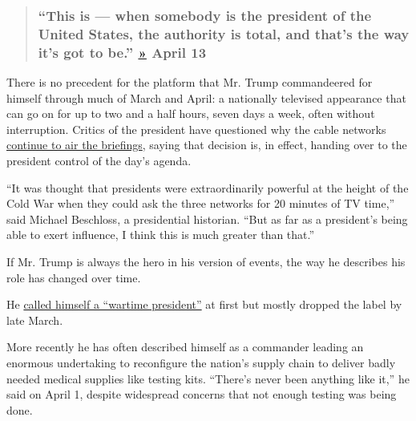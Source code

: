 \begin{quote}
\hypertarget{this-is--when-somebody-is-the-president-of-the-united-states-the-authority-is-total-and-thats-the-way-its-got-to-be--april-13}{%
\subsubsection{\texorpdfstring{``This is --- when somebody is the
president of the United States, the authority is total, and that's the
way it's got to be.''
\href{https://www.whitehouse.gov/briefings-statements/remarks-president-trump-vice-president-pence-members-coronavirus-task-force-press-briefing-25/}{»}
\textbf{April
13}}{``This is --- when somebody is the president of the United States, the authority is total, and that's the way it's got to be.'' » April 13}}\label{this-is--when-somebody-is-the-president-of-the-united-states-the-authority-is-total-and-thats-the-way-its-got-to-be--april-13}}
\end{quote}

There is no precedent for the platform that Mr. Trump commandeered for
himself through much of March and April: a nationally televised
appearance that can go on for up to two and a half hours, seven days a
week, often without interruption. Critics of the president have
questioned why the cable networks
\href{https://www.nytimes3xbfgragh.onion/2020/03/25/business/media/trump-coronavirus-briefings-ratings.html}{continue
to air the briefings}, saying that decision is, in effect, handing over
to the president control of the day's agenda.

``It was thought that presidents were extraordinarily powerful at the
height of the Cold War when they could ask the three networks for 20
minutes of TV time,'' said Michael Beschloss, a presidential historian.
``But as far as a president's being able to exert influence, I think
this is much greater than that.''

If Mr. Trump is always the hero in his version of events, the way he
describes his role has changed over time.

He
\href{https://www.nytimes3xbfgragh.onion/2020/03/22/us/politics/coronavirus-trump-wartime-president.html}{called
himself a ``wartime president''} at first but mostly dropped the label
by late March.

More recently he has often described himself as a commander leading an
enormous undertaking to reconfigure the nation's supply chain to deliver
badly needed medical supplies like testing kits. ``There's never been
anything like it,'' he said on April 1, despite widespread concerns that
not enough testing was being done.

